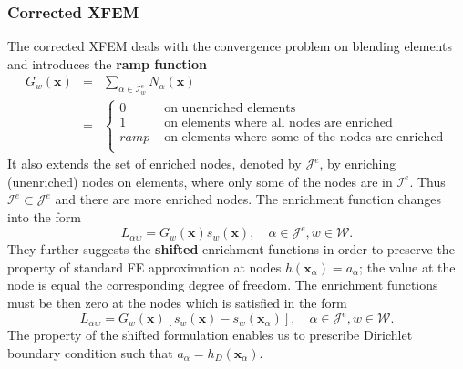 \documentclass[preprint,12pt,authoryear]{elsarticle}
\newcommand{\bx}{\mathbf{x}}
\begin{document}
\subsubsection{Corrected XFEM}
The corrected XFEM \citep{cxfem} deals with the convergence problem on blending elements and 
introduces the \textbf{ramp function}
\begin{eqnarray} \label{eqn:ramp_function}
  G_w(\bx) &=& \sum \limits_{\alpha\in\mathcal{I}_w^e} N_\alpha(\bx)    \\
  &=& 
  \begin{cases}
    0 & \textrm{ on unenriched elements}    \\
    1 & \textrm{ on elements where all nodes are enriched}    \\
    ramp & \textrm{ on elements where some of the nodes are enriched}    \\
  \end{cases} \nonumber
\end{eqnarray}
It also extends the set of enriched nodes, denoted by $\mathcal{J}^e$, by enriching (unenriched) nodes 
on elements, where only some of the nodes are in $\mathcal{I}^e$. Thus $\mathcal{I}^e\subset\mathcal{J}^e$ 
and there are more enriched nodes.
The enrichment function changes into the form
\begin{equation} \label{eqn:xfem_ramp}
    L_{\alpha w} = G_w(\bx) s_{w}(\bx), \quad \alpha\in\mathcal{J}^e, w\in\mathcal{W}.
\end{equation}
They further suggests the \textbf{shifted} enrichment functions in order to preserve the property of standard 
FE approximation at nodes $h(\bx_\alpha)=a_\alpha$; the value at the node is equal the corresponding degree
of freedom. The enrichment functions must be then zero at the nodes which is satisfied in the form
\begin{equation} \label{eqn:xfem_shift}
    L_{\alpha w} = G_w(\bx) \left[s_w(\bx) - s_w(\bx_\alpha)\right],
    \quad \alpha\in\mathcal{J}^e, w\in\mathcal{W}.
\end{equation} 
The property of the shifted formulation enables us to prescribe Dirichlet boundary condition such that
$a_\alpha = h_D(\bx_\alpha)$.
\end{document}
